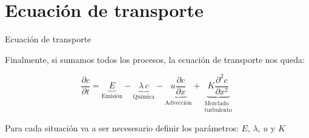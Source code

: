 \section{Ecuación de transporte}
\begin{frame}{Ecuación de transporte}

Finalmente, si sumamos todos los procesos, la ecuación de transporte nos queda:

$$
\boxed{
    \dfrac{\partial c}{\partial t}  
    =
    \underbrace{E }_{\text{Emisión}}
    -
    \underbrace{\lambda \,c}_{\text{Química}}
    -
    \underbrace{u \dfrac{\partial c}{\partial x}  }_{\text{Advección}}
    +
    \underbrace{K \dfrac{\partial^2 c}{\partial x^2} }_{\begin{smallmatrix}\text{Mezclado}\\ \text{turbulento} \end{smallmatrix}}
}
$$

\vspace{1.5em}
Para cada situación va a ser necesesario definir los parámetros: $E$, $\lambda$, $u$ y $K$
\end{frame}

